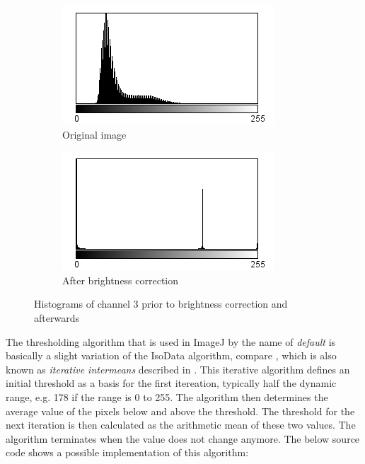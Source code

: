 \documentclass[a4paper, 12pt]{article}
\begin{document}
\begin{figure}[h]
\centering
\begin{subfigure}[b]{0.4\textwidth}
\includegraphics[width=\textwidth]{images/histogram_original}
\caption{Original image}
\end{subfigure}
\quad
\begin{subfigure}[b]{0.4\textwidth}
\includegraphics[width=\textwidth]{images/histogram_brightness_corrected}
\caption{After brightness correction}
\end{subfigure}
\caption{Histograms of channel 3 prior to brightness correction and afterwards}
\label{fig:example_histograms}
\end{figure}

The thresholding algorithm that is used in ImageJ by the name of
\textit{default} is basically a slight variation of the IsoData algorithm,
compare \cite{landini13}, which is also known as \textit{iterative intermeans} described
in \cite{ridler78}. This iterative algorithm defines an initial threshold as a
basis for the first itereation, typically half the dynamic range, e.g. 178 if
the range is 0 to 255. The algorithm then determines the average value of the
pixels below and above the threshold. The threshold for the next iteration is
then calculated as the  arithmetic mean of these two values. The algorithm
terminates when the value does not change anymore. The below source code shows
a possible implementation of this algorithm:
\end{document}
